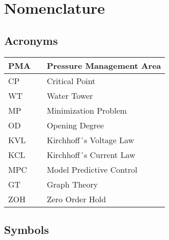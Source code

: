 \chapter{Nomenclature}

\section*{Acronyms}
	
	\begin{tabular}{|l c l|} \hline
		PMA 		&&	Pressure Management Area		\\ \hline
		CP			&&	Critical Point					\\ \hline
		WT			&&	Water Tower						\\ \hline
		MP		  	&&	Minimization Problem			\\ \hline
		OD 			&&  Opening Degree					\\ \hline
		KVL 		&&  Kirchhoff´s Voltage Law 		\\ \hline
		KCL 		&&  Kirchhoff´s Current Law			\\ \hline
		MPC			&&  Model Predictive Control		\\ \hline
		GT			&&  Graph Theory					\\ \hline
		ZOH			&&  Zero Order Hold					\\ \hline
	\end{tabular}

\section*{Symbols}


